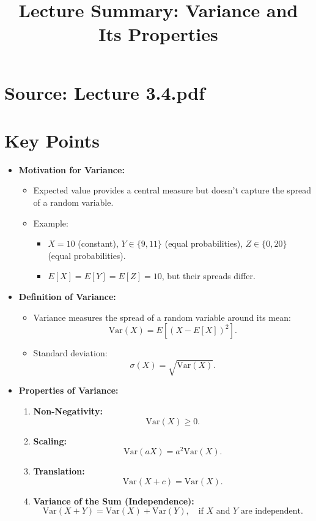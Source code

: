 \documentclass{article}
\title{Lecture Summary: Variance and Its Properties}
\author{}
\date{}
\begin{document}
\maketitle

\section*{Source: Lecture 3.4.pdf}

\section*{Key Points}

\begin{itemize}
  \item \textbf{Motivation for Variance:}
    \begin{itemize}
      \item Expected value provides a central measure but doesn't capture the spread of a random variable.
      \item Example:
        \begin{itemize}
          \item $X = 10$ (constant), $Y \in \{9, 11\}$ (equal probabilities), $Z \in \{0, 20\}$ (equal probabilities).
          \item $E[X] = E[Y] = E[Z] = 10$, but their spreads differ.
        \end{itemize}
    \end{itemize}

  \item \textbf{Definition of Variance:}
    \begin{itemize}
      \item Variance measures the spread of a random variable around its mean:
        \[
          \text{Var}(X) = E[(X - E[X])^2].
        \]
      \item Standard deviation:
        \[
          \sigma(X) = \sqrt{\text{Var}(X)}.
        \]
    \end{itemize}

  \item \textbf{Properties of Variance:}
    \begin{enumerate}
      \item \textbf{Non-Negativity:}
        \[
          \text{Var}(X) \geq 0.
        \]
      \item \textbf{Scaling:}
        \[
          \text{Var}(aX) = a^2 \text{Var}(X).
        \]
      \item \textbf{Translation:}
        \[
          \text{Var}(X + c) = \text{Var}(X).
        \]
      \item \textbf{Variance of the Sum (Independence):}
        \[
          \text{Var}(X + Y) = \text{Var}(X) + \text{Var}(Y), \quad \text{if } X \text{ and } Y \text{ are independent.}
        \]
    \end{enumerate}


\end{itemize}
\end{document}
